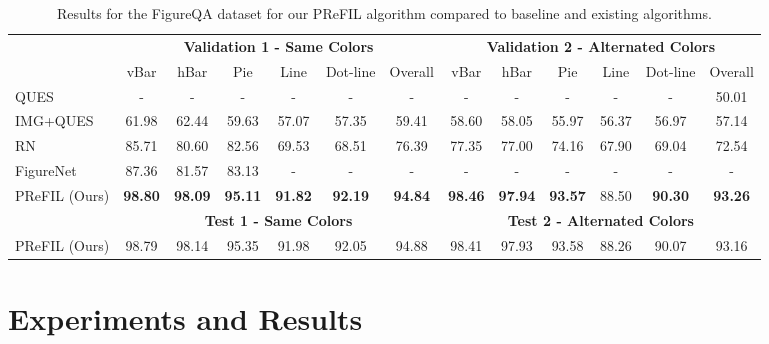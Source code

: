 \documentclass[10pt,twocolumn]{article}
\begin{document}
\begin{table*}
\centering
\footnotesize
\label{tab:results-figureqa}
\caption{Results for the FigureQA dataset for our PReFIL algorithm compared to baseline and existing algorithms.}
\vspace{2pt}
\begin{tabular}{@{}lcccccccccccc@{}}
\toprule
          & \multicolumn{6}{c}{\textbf{Validation 1 - Same Colors}}         & \multicolumn{6}{c}{\textbf{Validation 2 - Alternated Colors}} \\ 
          \cmidrule(r){2-7} \cmidrule(r){8-13}
          & vBar  & hBar  & Pie   & Line & Dot-line & Overall        & vBar  & hBar  & Pie   & Line  & Dot-line & Overall        \\ \midrule
QUES \cite{figureqa}      & -     & -     & -     & -    & -        & -              & -     & -     & -     & -    & -                 & 50.01          \\
IMG+QUES \cite{figureqa}  & 61.98     & 62.44     & 59.63     & 57.07    & 57.35        & 59.41              & 58.60 & 58.05 & 55.97 & 56.37 & 56.97    & 57.14          \\
RN \cite{figureqa}        & 85.71     & 80.60     & 82.56     & 69.53    & 68.51        & 76.39              & 77.35 & 77.00 & 74.16 & 67.90 & 69.04    & 72.54          \\
FigureNet \cite{reddy2018question} & 87.36 & 81.57 & 83.13 & -    & -        & -          & -     & -     & -     & -     & -        & -              \\
PReFIL (Ours)      & \textbf{98.80}   & \textbf{98.09}   & \textbf{95.11}   & \textbf{91.82}  & \textbf{92.19}      & \textbf{94.84} & \textbf{98.46}   & \textbf{97.94}   & \textbf{93.57}   &88.50   &\textbf{ 90.30}      & \textbf{93.26} \\ \midrule
& \multicolumn{6}{c}{\textbf{Test 1 - Same Colors}}         & \multicolumn{6}{c}{\textbf{Test 2 - Alternated Colors}}   \\ \midrule
PReFIL (Ours)      & 98.79   & 98.14   & 95.35   & 91.98  & 92.05      & 94.88 & 98.41   & 97.93   & 93.58   & 88.26  & 90.07      & 93.16 \\ \bottomrule
\end{tabular}
\end{table*}


\section{Experiments and Results}
\label{sec:experiments}
\end{document}

